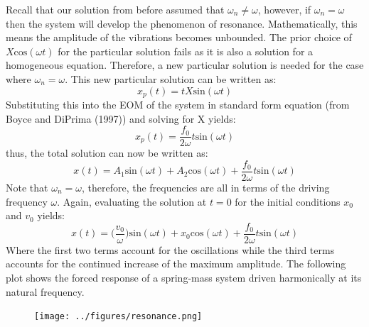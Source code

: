 \documentclass[12pt,letter]{article}
\numberwithin{ex}{section} %
\numberwithin{re}{section} %
\begin{document}
			Recall that our solution from before assumed that $\omega_n \neq \omega$, however, if $\omega_n = \omega$ then the system will develop the phenomenon of resonance. Mathematically, this means the amplitude of the vibrations becomes unbounded. The prior choice of $X\text{cos}(\omega t)$ for the particular solution fails as it is also a solution for a homogeneous equation. Therefore, a new particular solution is needed for the case where $\omega_n = \omega$. This new particular solution can be written as:
			\begin{equation}
				x_p(t) = t X\text{sin}(\omega t)
			\end{equation}				
			Substituting this into the EOM of the system in standard form equation (from Boyce and DiPrima (1997)) and solving for X yields:
			\begin{equation}
				x_p(t) = \frac{f_0}{2 \omega} t \text{sin}(\omega t)
			\end{equation}	
			thus, the total solution can now be written as:
			\begin{equation}
				x(t) = A_1\text{sin}(\omega t) + A_2\text{cos}(\omega t) + \frac{f_0}{2 \omega} t \text{sin}(\omega t)
			\end{equation}			
			Note that $\omega_n=\omega$, therefore, the frequencies are all in terms of the driving frequency $\omega$. Again, evaluating the solution at $t=0$ for the initial conditions $x_0$ and $v_0$ yields:
			\begin{equation}
				x(t) = \Big(\frac{v_0}{\omega}\Big)\text{sin}(\omega t) + x_0\text{cos}(\omega t) + \frac{f_0}{2 \omega} t \text{sin}(\omega t)
			\end{equation}			
			Where the first two terms account for the oscillations while the third terms accounts for the continued increase of the maximum amplitude. The following plot shows the forced response of a spring-mass system driven harmonically at its natural frequency.
			\begin{figure}[H]
				\centering
				\texttt{[image: ../figures/resonance.png]}
			\end{figure}				
\end{document}
